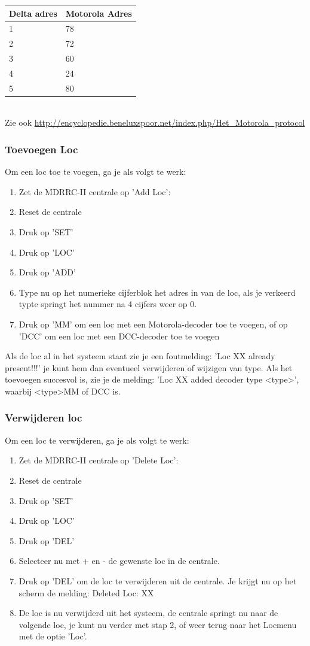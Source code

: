 \documentclass[12pt,a4paper]{report}
\begin{document}
\begin{tabular}{|l|l|}
\hline
Delta adres&Motorola Adres\\
\hline
1&78\\
\hline
2&72\\
\hline
3&60\\
\hline
4&24\\
\hline
5&80\\
\hline
\end{tabular}\\

Zie ook \url{http://encyclopedie.beneluxspoor.net/index.php/Het_Motorola_protocol}

\subsubsection{Toevoegen Loc}
Om een loc toe te voegen, ga je als volgt te werk:

\begin{enumerate}
\item Zet de MDRRC-II centrale op 'Add Loc': 
\item Reset de centrale
\item Druk op 'SET'
\item Druk op 'LOC'
\item Druk op 'ADD'
\item Type nu op het numerieke cijferblok het adres in van de loc, als je verkeerd typte springt het nummer na 4 cijfers weer op 0.
\item Druk op 'MM' om een loc met een Motorola-decoder toe te voegen, of op 'DCC' om een loc met een DCC-decoder toe te voegen
\end{enumerate}

Als de loc al in het systeem staat zie je een foutmelding:
 'Loc XX already present!!!'
je kunt hem dan eventueel verwijderen of wijzigen van type. Als het toevoegen succesvol is, zie je de melding: 'Loc XX added decoder type \textless type\textgreater ', 
waarbij \textless type\textgreater  MM of DCC is.
\subsubsection{Verwijderen loc}
Om een loc te verwijderen, ga je als volgt te werk:
\begin{enumerate}
\item Zet de MDRRC-II centrale op 'Delete Loc': 
\item Reset de centrale
\item Druk op 'SET'
\item Druk op 'LOC'
\item Druk op 'DEL'
\item Selecteer nu met + en - de gewenste loc in de centrale.
\item Druk op 'DEL' om de loc te verwijderen uit de centrale. Je krijgt nu op het scherm de melding:
Deleted Loc: XX
\item De loc is nu verwijderd uit het systeem, de centrale springt nu naar de volgende loc, je kunt nu verder met stap 2, of weer terug naar het Locmenu met de optie 'Loc'.
\end{enumerate}
\end{document}
